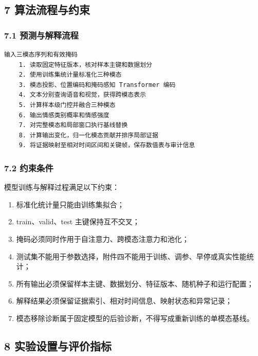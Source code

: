 \documentclass[
  12pt,
  a4paper,
]{ctexart}
\providecommand{\tightlist}{%
  \setlength{\itemsep}{0pt}\setlength{\parskip}{0pt}}
\begin{document}
\hypertarget{ux7b97ux6cd5ux6d41ux7a0bux4e0eux7ea6ux675f}{%
\subsection{7
算法流程与约束}\label{ux7b97ux6cd5ux6d41ux7a0bux4e0eux7ea6ux675f}}

\hypertarget{ux9884ux6d4bux4e0eux89e3ux91caux6d41ux7a0b}{%
\subsubsection{7.1
预测与解释流程}\label{ux9884ux6d4bux4e0eux89e3ux91caux6d41ux7a0b}}

\begin{verbatim}
输入三模态序列和有效掩码
    1. 读取固定特征版本，核对样本主键和数据划分
    2. 使用训练集统计量标准化三种模态
    3. 模态投影、位置编码和掩码感知 Transformer 编码
    4. 文本分别查询语音和视觉，获得跨模态表示
    5. 计算样本级门控并融合三种模态
    6. 输出情感类别概率和情感强度
    7. 对完整模态和局部窗口执行基线替换
    8. 计算输出变化，归一化模态贡献并排序局部证据
    9. 将证据映射至相对时间区间和关键帧，保存数值表与审计信息
\end{verbatim}

\hypertarget{ux7ea6ux675fux6761ux4ef6}{%
\subsubsection{7.2 约束条件}\label{ux7ea6ux675fux6761ux4ef6}}

模型训练与解释过程满足以下约束：

\begin{enumerate}
\def\labelenumi{\arabic{enumi}.}
\tightlist
\item
  标准化统计量只能由训练集拟合；
\item
  train、valid、test 主键保持互不交叉；
\item
  掩码必须同时作用于自注意力、跨模态注意力和池化；
\item
  测试集不能用于参数选择，附件四不能用于训练、调参、早停或真实性能统计；
\item
  所有输出必须保留样本主键、数据划分、特征版本、随机种子和运行配置；
\item
  解释结果必须保留证据索引、相对时间信息、映射状态和异常记录；
\item
  模态移除诊断属于固定模型的后验诊断，不得写成重新训练的单模态基线。
\end{enumerate}

\hypertarget{ux5b9eux9a8cux8bbeux7f6eux4e0eux8bc4ux4ef7ux6307ux6807}{%
\subsection{8
实验设置与评价指标}\label{ux5b9eux9a8cux8bbeux7f6eux4e0eux8bc4ux4ef7ux6307ux6807}}
\end{document}
